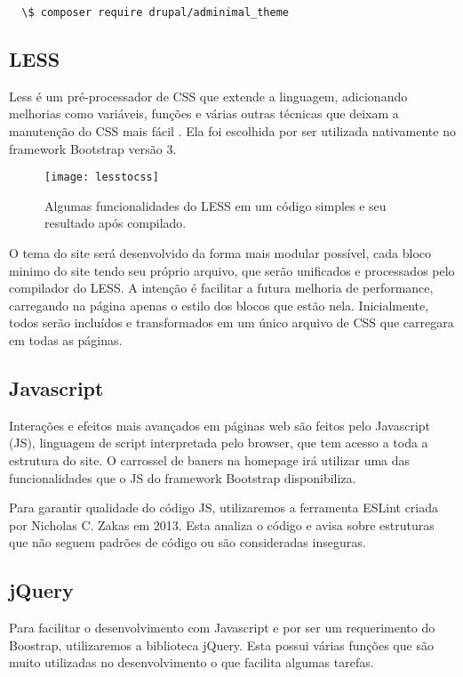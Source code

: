 \begin{lstlisting}
  \$ composer require drupal/adminimal_theme
\end{lstlisting}

\subsection{LESS}
Less é um pré-processador de CSS que extende a linguagem, adicionando melhorias como variáveis, funções e várias outras técnicas que deixam a manutenção do CSS mais fácil \cite{Less}. Ela foi escolhida por ser utilizada nativamente no framework Bootstrap versão 3.

\begin{figure}[ht]
  \centering
  \texttt{[image: lesstocss]}
  \caption{Algumas funcionalidades do LESS em um código simples e seu resultado após compilado.}
  \label{lesstocss}
\end{figure}

O tema do site será desenvolvido da forma mais modular possível, cada bloco minimo do site tendo seu próprio arquivo, que serão unificados e processados pelo compilador do LESS. A intenção é facilitar a futura melhoria de performance, carregando na página apenas o estilo dos blocos que estão nela. Inicialmente, todos serão incluídos e transformados em um único arquivo de CSS que carregara em todas as páginas.

\subsection{Javascript}
Interações e efeitos mais avançados em páginas web são feitos pelo Javascript (JS), linguagem de script interpretada pelo browser, que tem acesso a toda a estrutura do site. O carrossel de baners na homepage irá utilizar uma das funcionalidades que o JS do framework Bootstrap disponibiliza.

Para garantir qualidade do código JS, utilizaremos a ferramenta ESLint criada por Nicholas C. Zakas em 2013. Esta analiza o código e avisa sobre estruturas que não seguem  padrões de código ou são consideradas inseguras.

\subsection{jQuery}
Para facilitar o desenvolvimento com Javascript e por ser um requerimento do Boostrap, utilizaremos a biblioteca jQuery. Esta possui várias funções que são muito utilizadas no desenvolvimento o que facilita algumas tarefas.

